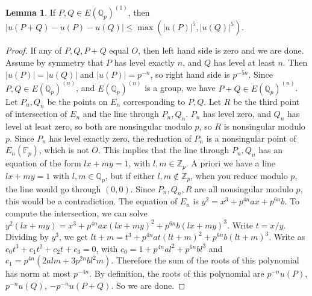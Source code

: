 \documentclass{article}
\newcommand{\F}{\mathbb{F}}
\newcommand{\Z}{\mathbb{Z}}
\newcommand{\Q}{\mathbb{Q}}
\newcommand{\rb}[1]{\left( #1 \right)}
\newcommand{\abs}[1]{\left\lvert #1 \right\rvert}
\theoremstyle{definition}\newtheorem{definition}{Definition}[section]
\theoremstyle{definition}\newtheorem{remark}[definition]{Remark}
\theoremstyle{definition}\newtheorem*{example}{Example}
\theoremstyle{definition}\newtheorem*{note}{Note}
\newtheorem{lemma}[definition]{Lemma}
\begin{document}
\begin{lemma}
If $ P, Q \in E\rb{\Q_p}^{\rb{1}} $, then $ \abs{u\rb{P + Q} - u\rb{P} - u\rb{Q}} \le \max\rb{\abs{u\rb{P}}^5, \abs{u\rb{Q}}^5} $.
\end{lemma}

\begin{proof}
If any of $ P, Q, P + Q $ equal $ O $, then left hand side is zero and we are done. Assume by symmetry that $ P $ has level exactly $ n $, and $ Q $ has level at least $ n $. Then $ \abs{u\rb{P}} = \abs{u\rb{Q}} $ and $ \abs{u\rb{P}} = p^{-n} $, so right hand side is $ p^{-5n} $. Since $ P, Q \in E\rb{\Q_p}^{\rb{n}} $, and $ E\rb{\Q_p}^{\rb{n}} $ is a group, we have $ P + Q \in E\rb{\Q_p}^{\rb{n}} $. Let $ P_n, Q_n $ be the points on $ E_n $ corresponding to $ P, Q $. Let $ R $ be the third point of intersection of $ E_n $ and the line through $ P_n, Q_n $. $ P_n $ has level zero, and $ Q_n $ has level at least zero, so both are nonsingular modulo $ p $, so $ R $ is nonsingular modulo $ p $. Since $ P_n $ has level exactly zero, the reduction of $ P_n $ is a nonsingular point of $ E_n\rb{\F_p} $, which is not $ O $. This implies that the line through $ P_n, Q_n $ has an equation of the form $ lx + my = 1 $, with $ l, m \in \Z_p $. A priori we have a line $ lx + my = 1 $ with $ l, m \in \Q_p $, but if either $ l, m \notin \Z_p $, when you reduce modulo $ p $, the line would go through $ \rb{0, 0} $. Since $ P_n, Q_n, R $ are all nonsingular modulo $ p $, this would be a contradiction. The equation of $ E_n $ is $ y^2 = x^3 + p^{4n}ax + p^{6n}b $. To compute the intersection, we can solve $ y^2\rb{lx + my} = x^3 + p^{4n}ax\rb{lx + my}^2 + p^{6n}b\rb{lx + my}^3 $. Write $ t = x / y $. Dividing by $ y^3 $, we get $ lt + m = t^3 + p^{4n}at\rb{lt + m}^2 + p^{6n}b\rb{lt + m}^3 $. Write as $ c_0t^3 + c_1t^2 + c_2t + c_3 = 0 $, with $ c_0 = 1 + p^{4n}al^2 + p^{6n}bl^3 $ and $ c_1 = p^{4n}\rb{2alm + 3p^{2n}bl^2m} $. Therefore the sum of the roots of this polynomial has norm at most $ p^{-4n} $. By definition, the roots of this polynomial are $ p^{-n}u\rb{P} $, $ p^{-n}u\rb{Q} $, $ -p^{-n}u\rb{P + Q} $. So we are done.
\end{proof}
\end{document}
